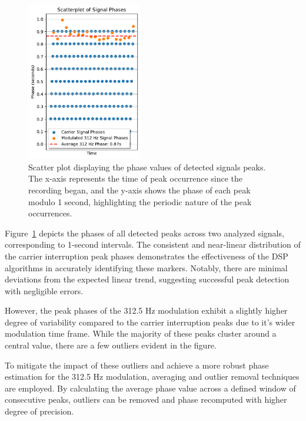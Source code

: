 \documentclass[12pt, a4paper]{extarticle}
\begin{document}
\begin{figure}[H]
    \centering
    \includegraphics[width=0.45\textwidth]{signal-phases-scatter.pdf}
    \captionsetup{width=0.8\textwidth}
        \caption{Scatter plot displaying the phase values of detected signals
        peaks. The x-axis represents the time of peak occurrence since the
        recording began, and the y-axis shows the phase of each peak modulo 1
        second, highlighting the periodic nature of the peak occurrences.}
    \label{fig:signal-phases-scatter}
\end{figure}

Figure~\ref{fig:signal-phases-scatter} depicts the phases of all detected peaks
across two analyzed signals, corresponding to 1-second intervals. The
consistent and near-linear distribution of the carrier interruption peak phases
demonstrates the effectiveness of the DSP algorithms in accurately identifying
these markers. Notably, there are minimal deviations from the expected linear
trend, suggesting successful peak detection with negligible errors.

However, the peak phases of the 312.5 Hz modulation exhibit a slightly higher
degree of variability compared to the carrier interruption peaks due to it's
wider modulation time frame. While the majority of these peaks cluster around a
central value, there are a few outliers evident in the figure.

To mitigate the impact of these outliers and achieve a more robust phase
estimation for the 312.5 Hz modulation, averaging and outlier removal
techniques are employed.
By calculating the average phase value across a defined window of consecutive
peaks, outliers can be removed and phase recomputed with higher degree of precision.
\end{document}
